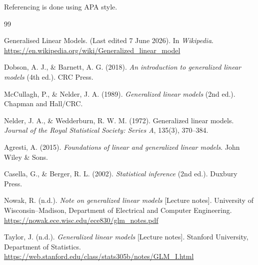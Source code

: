 \documentclass[12pt,a4paper]{report}
\begin{document}
Referencing is done using APA style.

\begin{thebibliography}{99}\setlength{\itemsep}{0.5em}

 Generalised Linear Models. (Last edited 7 June 2026). In \textit{Wikipedia}. \url{https://en.wikipedia.org/wiki/Generalized_linear_model}

 Dobson, A. J., \& Barnett, A. G. (2018). \textit{An introduction to generalized linear models} (4th ed.). CRC Press.

 McCullagh, P., \& Nelder, J. A. (1989). \textit{Generalized linear models} (2nd ed.). Chapman and Hall/CRC.

 Nelder, J. A., \& Wedderburn, R. W. M. (1972). Generalized linear models. \textit{Journal of the Royal Statistical Society: Series A}, 135(3), 370--384.

 Agresti, A. (2015). \textit{Foundations of linear and generalized linear models}. John Wiley \& Sons.

 Casella, G., \& Berger, R. L. (2002). \textit{Statistical inference} (2nd ed.). Duxbury Press.

 Nowak, R. (n.d.). \textit{Note on generalized linear models} [Lecture notes]. University of Wisconsin--Madison, Department of Electrical and Computer Engineering. \url{https://nowak.ece.wisc.edu/ece830/glm_notes.pdf}

 Taylor, J. (n.d.). \textit{Generalized linear models} [Lecture notes]. Stanford University, Department of Statistics. \url{https://web.stanford.edu/class/stats305b/notes/GLM_I.html}

\end{thebibliography}
\end{document}
